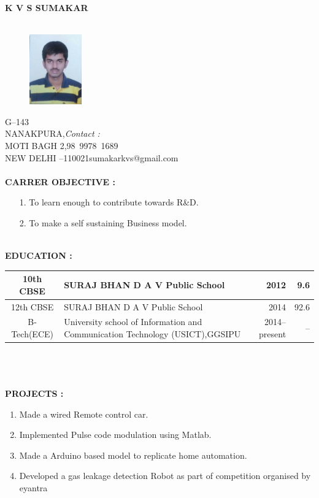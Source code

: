 \documentclass{article}
\begin{document}
	\begin{center}
		\textbf{K V S SUMAKAR}\\
		\hrulefill\\
		
	\end{center}
	\begin{figure}[h]
		\centering
	\includegraphics[width=0.2\textwidth]{IMG-20160524-WA0002}
	
	\end{figure}
	G--143\\ 
	NANAKPURA,\hfill \textsl{Contact :}\\
	MOTI BAGH 2,\hfill \mbox{98 9978 1689}\\
	NEW DELHI --\mbox{110021}\hfill \mbox{sumakarkvs@gmail.com}\\
	\\
	\leavevmode
	\textbf{CARRER OBJECTIVE :}
	\begin{itemize}
\item[1.] 	To learn enough to contribute towards R\&D.
\item[2.]	To make a self sustaining Business model.\\
	\end{itemize}
	
\leavevmode\\
	\textbf{EDUCATION :\\}

	\begin{tabular}{|c|p{60 mm}|r|r|}
 \hline
		 10th CBSE  &                    SURAJ BHAN D A V Public School                    &            2012 &             9.6 \\ \hline
		 12th CBSE  &                    SURAJ BHAN D A V Public School                    &            2014 &            92.6 \\ \hline
		B-Tech(ECE) & University school of Information and Communication Technology (USICT),GGSIPU &   2014--present &              -- \\ \hline
	\end{tabular}
	\\
	\\
\leavevmode
\\
	\textbf{PROJECTS :}
	\begin{enumerate}
		\item Made a wired Remote control car.
		\item Implemented Pulse code modulation using Matlab.
		\item Made a Arduino based model to replicate home automation.
		\item Developed a gas leakage detection Robot as part of competition organised by eyantra
	\end{enumerate}
\end{document}
